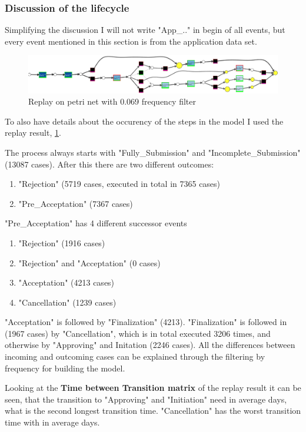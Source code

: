 \subsubsection{Discussion of the lifecycle}
Simplifying the discussion I will not write "App\_.." in begin of all events, but every event mentioned in this section is from the application data set.
\begin{figure}[!htbp]
\centering
\includegraphics[width=0.9\linewidth]{APP_Replay.PNG}
\caption{Replay on petri net with 0.069 frequency filter}
\label{fig:App_EndReplay}
\end{figure}
To also have details about the occurency of the steps in the model I used the replay result, \ref{fig:App_EndReplay}.


The process always starts with "Fully\_Submission" and "Incomplete\_Submission" (13087 cases). After this there are two different outcomes:
\begin{enumerate}
	\item "Rejection" (5719 cases, executed in total in 7365 cases)
	\item "Pre\_Acceptation" (7367 cases)
\end{enumerate}

"Pre\_Acceptation" has 4 different successor events
\begin{enumerate}
	\item "Rejection" (1916 cases)
	\item "Rejection" and "Acceptation" (0 cases)
	\item "Acceptation" (4213 cases)
	\item "Cancellation" (1239 cases)
\end{enumerate}
"Acceptation" is followed by "Finalization" (4213). "Finalization" is followed in (1967 cases) by "Cancellation", which is in total executed 3206 times, and otherwise by "Approving" and Initation (2246 cases).
All the differences between incoming and outcoming cases can be explained through the filtering by frequency for building the model.

Looking at the \textbf{Time between Transition matrix} of the replay result it can be seen, that the transition to "Approving" and "Initiation" need in average  days, what is the second longest transition time. "Cancellation" has the worst transition time with in average  days.

